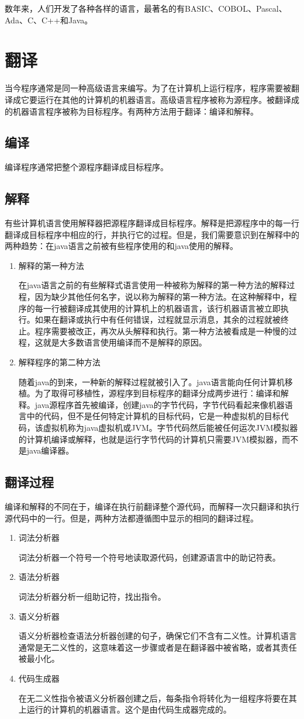 数年来，人们开发了各种各样的语言，最著名的有BASIC、COBOL、Pascal、Ada、C、C++和Java。
\section{翻译}
当今程序通常是同一种高级语言来编写。为了在计算机上运行程序，程序需要被翻译成它要运行在其他的计算机的机器语言。高级语言程序被称为源程序。被翻译成的机器语言程序被称为目标程序。有两种方法用于翻译：编译和解释。
\subsection{编译}
编译程序通常把整个源程序翻译成目标程序。
\subsection{解释}
有些计算机语言使用解释器把源程序翻译成目标程序。解释是把源程序中的每一行翻译成目标程序中相应的行，并执行它的过程。但是，我们需要意识到在解释中的两种趋势：在java语言之前被有些程序使用的和java使用的解释。
\begin{enumerate}
	\item 解释的第一种方法

	在java语言之前的有些解释式语言使用一种被称为解释的第一种方法的解释过程，因为缺少其他任何名字，说以称为解释的第一种方法。在这种解释中，程序的每一行被翻译成其使用的计算机上的机器语言，该行机器语言被立即执行。如果在翻译或执行中有任何错误，过程就显示消息，其余的过程就被终止。程序需要被改正，再次从头解释和执行。第一种方法被看成是一种慢的过程，这就是大多数语言使用编译而不是解释的原因。
	\item 解释程序的第二种方法

	随着java的到来，一种新的解释过程就被引入了。java语言能向任何计算机移植。为了取得可移植性，源程序到目标程序的翻译分成两步进行：编译和解释。java源程序首先被编译，创建java的字节代码，字节代码看起来像机器语言中的代码，但不是任何特定计算机的目标代码，它是一种虚拟机的目标代码，该虚拟机称为java虚拟机或JVM。字节代码然后能被任何运次JVM模拟器的计算机编译或解释，也就是运行字节代码的计算机只需要JVM模拟器，而不是java编译器。
\end{enumerate}
\subsection{翻译过程}
编译和解释的不同在于，编译在执行前翻译整个源代码，而解释一次只翻译和执行源代码中的一行。但是，两种方法都遵循图中显示的相同的翻译过程。
\begin{enumerate}
	\item 词法分析器

	词法分析器一个符号一个符号地读取源代码，创建源语言中的助记符表。
	\item 语法分析器

	词法分析器分析一组助记符，找出指令。
	\item 语义分析器

	语义分析器检查语法分析器创建的句子，确保它们不含有二义性。计算机语言通常是无二义性的，这意味着这一步骤或者是在翻译器中被省略，或者其责任被最小化。
	\item 代码生成器

	在无二义性指令被语义分析器创建之后，每条指令将转化为一组程序将要在其上运行的计算机的机器语言。这个是由代码生成器完成的。
\end{enumerate}
